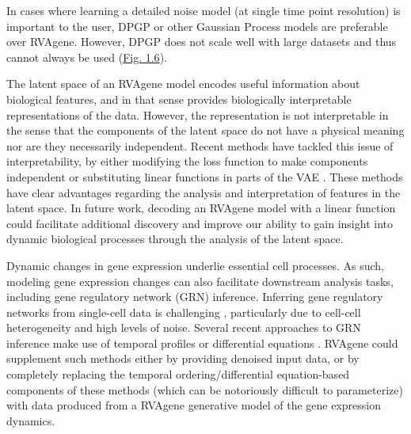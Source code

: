 {In cases where learning a detailed noise model (at single time point resolution) is important to the user, DPGP or other Gaussian Process models are preferable over RVAgene.}
However, DPGP does not scale well with large datasets and thus cannot always be used
(\hyperref[fig:fig7]{Fig. 1.6}).
\par 
The latent space of an RVAgene model encodes useful information about biological features, and in that sense provides biologically interpretable representations of the data. However, the representation is not interpretable in the sense that the components of the latent space do not have a physical meaning nor are they necessarily independent. Recent methods have tackled this issue of interpretability, by either modifying the loss function to make components independent \citep{higgins2016beta} or substituting linear functions in parts of the VAE \citep{svensson2020interpretable, ainsworth2018oi}. These methods have clear advantages regarding the analysis and interpretation of features in the latent space. In future work, decoding an RVAgene model with a linear function \citep{svensson2020interpretable} could facilitate additional discovery and improve our ability to gain insight into dynamic biological processes through the analysis of the latent space.
\par 
Dynamic changes in gene expression underlie essential cell processes. As such, modeling gene expression changes can also facilitate downstream analysis tasks, including gene regulatory network (GRN) inference. Inferring gene regulatory networks from single-cell data is challenging \citep{chen18_evaluating}, particularly due to cell-cell heterogeneity and high levels of noise. Several recent approaches to GRN inference make use of temporal profiles \citep{deshpande19_network, kim20_tenet}  
or differential equations \citep{ma20_inference, aubin-frankowski20_gene, matsumoto17_scode}. RVAgene could supplement such methods either by providing denoised input data, or by completely replacing the temporal ordering/differential equation-based components of these methods (which can be notoriously difficult to parameterize) with data produced from a RVAgene generative model of the gene expression dynamics.
\par 

